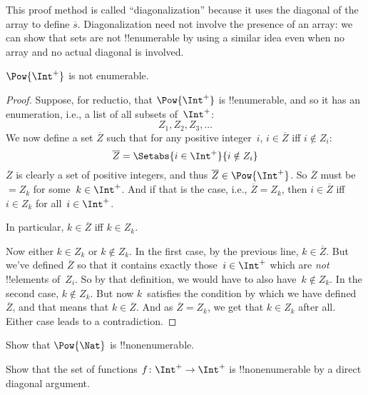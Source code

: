 \documentclass[../../../include/open-logic-section]{subfiles}
\begin{document}
\begin{explain}
This proof method is called ``diagonalization'' because it uses the
diagonal of the array to define $\overline{s}$. Diagonalization need
not involve the presence of an array: we can show that sets are not
!!{enumerable} by using a similar idea even when no array and no
actual diagonal is involved.
\end{explain}

\begin{thm}
$\Pow{\Int^+}$ is not enumerable.
\end{thm}

\begin{proof}
Suppose, for reductio, that $\Pow{\Int^+}$ is !!{enumerable}, and so
it has an enumeration, i.e., a list of all subsets of~$\Int^+$:
\[
Z_{1}, Z_{2}, Z_{3}, \dots
\]
We now define a set $\overline{Z}$ such that for any positive
integer~$i$, $i \in \overline{Z}$ iff $i \notin Z_{i}$:
\[
\overline{Z} = \Setabs{i \in \Int^+}{i \notin Z_i}
\]
$\overline{Z}$ is clearly a set of positive integers, and thus $\overline{Z}
\in \Pow{\Int^+}$. So $\overline{Z}$ must be $= Z_k$ for some~$k \in
\Int^+$. And if that is the case, i.e., $\overline{Z} = Z_k$, then $i
\in \overline{Z}$ iff $i \in Z_k$ for all~$i \in \Int^+$.

In particular, $k \in \overline{Z}$ iff $k \in Z_k$.

Now either $k \in Z_{k}$ or $k \notin Z_{k}$. In the first case, by
the previous line, $k \in \overline{Z}$. But we've defined
$\overline{Z}$ so that it contains exactly those~$i \in \Int^+$ which
are \emph{not} !!{element}s of~$Z_i$. So by that definition, we would
have to also have~$k \notin Z_k$. In the second case, $k \notin Z_k$.
But now $k$~satisfies the condition by which we have
defined~$\overline{Z}$, and that means that $k \in \overline{Z}$. And
as $\overline{Z} = Z_k$, we get that $k \in Z_k$ after all. Either
case leads to a contradiction.
\end{proof}

\begin{prob}
Show that $\Pow{\Nat}$ is !!{nonenumerable}.
\end{prob}

\begin{prob}
Show that the set of functions $f \colon \Int^+ \to \Int^+$ is
!!{nonenumerable} by a direct diagonal argument.
\end{prob}
\end{document}
